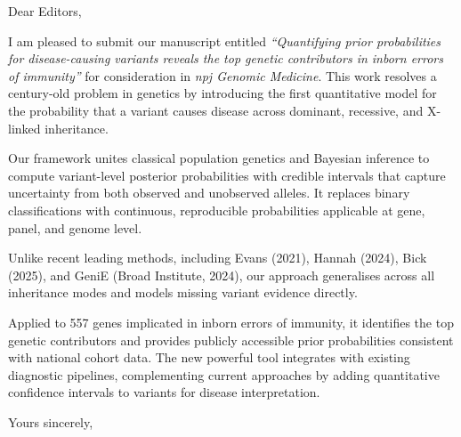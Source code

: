 \documentclass[12pt,a4paper]{letter}
\begin{document}
 

\begin{letter}{Dear Editors,}

\opening{}


I am pleased to submit our manuscript entitled 
\textit{``Quantifying prior probabilities for disease-causing variants reveals the top genetic contributors in inborn errors of immunity''}
 for consideration in 
\textit{npj Genomic Medicine}. 
This work resolves a century-old problem in genetics by introducing the first quantitative model for the probability that a variant causes disease across dominant, recessive, and X-linked inheritance.

Our framework unites classical population genetics and Bayesian inference to compute variant-level posterior probabilities with credible intervals that capture uncertainty from both observed and unobserved alleles. It replaces binary classifications with continuous, reproducible probabilities applicable at gene, panel, and genome level.

Unlike recent leading methods, including Evans (2021), Hannah (2024), Bick (2025), and GeniE (Broad Institute, 2024), our approach generalises across all inheritance modes and models missing variant evidence directly.

Applied to 557 genes implicated in inborn errors of immunity, it identifies the top genetic contributors and provides publicly accessible prior probabilities consistent with national cohort data. The new powerful tool integrates with existing diagnostic pipelines, complementing current approaches by adding quantitative confidence intervals to variants for disease interpretation.

\closing{Yours sincerely,}

\end{letter}
\end{document}
